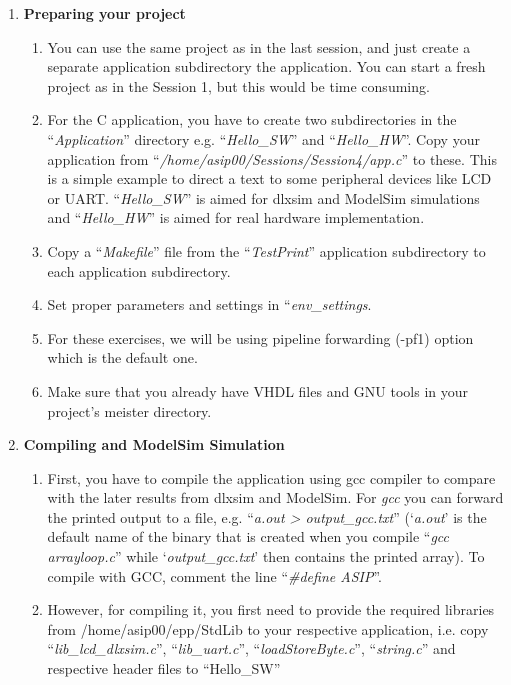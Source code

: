 \begin{enumerate}
\item \textbf{Preparing your project}
	\begin{enumerate}
		\item
		You can use the same project as in the last session, and just create
		a separate application subdirectory the application. You can start a
		fresh project as in the Session 1, but this would be time consuming.
		\item
		For the C application, you have to create two subdirectories in the
		``\emph{Application}'' directory e.g. ``\emph{Hello\_SW}'' and
		``\emph{Hello\_HW}''. Copy your application from
		``\emph{/home/asip00/Sessions/Session4/app.c}'' to these. This is a
		simple example to direct a text to some peripheral devices like LCD
		or UART. ``\emph{Hello\_SW}'' is aimed for dlxsim and ModelSim
		simulations and ``\emph{Hello\_HW}'' is aimed for real hardware
		implementation.
		\item
		Copy a ``\emph{Makefile}'' file from the ``\emph{TestPrint}''
		application subdirectory to each application subdirectory.
		\item
		Set proper parameters and settings in ``\emph{env\_settings}.
		\item
		For these exercises, we will be using pipeline forwarding (-pf1)
		option which is the default one.
		\item
		Make sure that you already have VHDL files and GNU tools in your
		project's meister directory.
	\end{enumerate}
\item \textbf{Compiling and ModelSim Simulation}
	\begin{enumerate}
		\item
		First, you have to compile the application using gcc compiler to
		compare with the later results from dlxsim and ModelSim. For
		\emph{gcc} you can forward the printed output to a file, e.g.
		``\emph{a.out \textgreater{} output\_gcc.txt}'' (`\emph{a.out}' is
		the default name of the binary that is created when you compile
		``\emph{gcc arrayloop.c}'' while `\emph{output\_gcc.txt}' then
		contains the printed array). To compile with GCC, comment the line
		``\emph{\#define ASIP}''.
		\item
		However, for compiling it, you first need to provide the required
		libraries from /home/asip00/epp/StdLib to your respective
		application, i.e. copy ``\emph{lib\_lcd\_dlxsim.c}'',
		``\emph{lib\_uart.c}'', ``\emph{loadStoreByte.c}'',
		``\emph{string.c}'' and respective header files to ``Hello\_SW''

\end{enumerate}
\end{enumerate}
